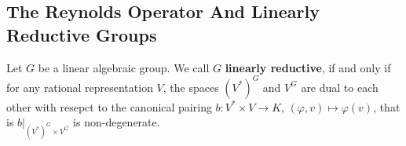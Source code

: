 
\subsection{The Reynolds Operator And Linearly Reductive Groups}

\begin{definition}
  Let $G$ be a linear algebraic group.
  We call $G$ \textbf{linearly reductive}, if and only if for any rational representation $V$, the spaces $(V^\ast)^G$ and $V^G$ are dual to each other with resepct to the canonical pairing $b \colon V^\ast \times V \longrightarrow K$, $(\varphi,v) \mapsto \varphi(v)$, that is $\left. b \right|_{(V^\ast)^G \times V^G}$ is non-degenerate.
\end{definition}



